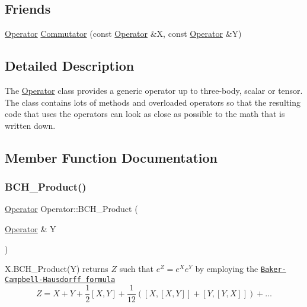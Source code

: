 \subsection*{Friends}
\begin{DoxyCompactItemize}
\item 
\hyperlink{classOperator}{Operator} \hyperlink{classOperator_a88b0cafa371bca287379a0ce89627e2b}{Commutator} (const \hyperlink{classOperator}{Operator} \&X, const \hyperlink{classOperator}{Operator} \&Y)
\end{DoxyCompactItemize}


\subsection{Detailed Description}
The \hyperlink{classOperator}{Operator} class provides a generic operator up to three-\/body, scalar or tensor. The class contains lots of methods and overloaded operators so that the resulting code that uses the operators can look as close as possible to the math that is written down. 

\subsection{Member Function Documentation}
\mbox{\label{classOperator_a6a91cd02db723ee28b7532e6af029033}} 
\subsubsection{\texorpdfstring{B\+C\+H\+\_\+\+Product()}{BCH\_Product()}}
{\footnotesize\ttfamily \hyperlink{classOperator}{Operator} Operator\+::\+B\+C\+H\+\_\+\+Product (\begin{DoxyParamCaption}\item[{\hyperlink{classOperator}{Operator} \&}]{Y }\end{DoxyParamCaption})}

X.\+B\+C\+H\+\_\+\+Product(\+Y) returns $Z$ such that $ e^{Z} = e^{X}e^{Y}$ by employing the \href{http://en.wikipedia.org/wiki/Baker-Campbell-Hausdorff_formula}{\tt Baker-\/\+Campbell-\/\+Hausdorff formula} \[ Z = X + Y + \frac{1}{2}[X,Y] + \frac{1}{12}([X,[X,Y]]+[Y,[Y,X]]) + \ldots \] \mbox{\label{classOperator_a9a2d6b13d851f2655f3ef88033a24c5b}} 
